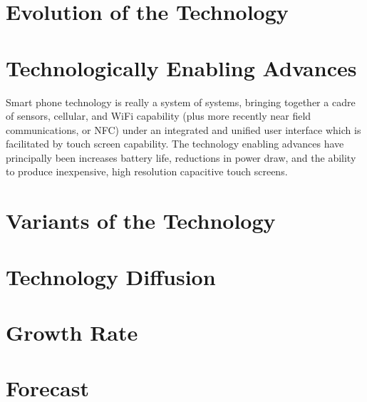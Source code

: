 \documentclass[letterpaper,10pt]{article}
\begin{document}
\section*{Evolution of the Technology}

\section*{Technologically Enabling Advances}
Smart phone technology is really a system of systems, bringing together a cadre of sensors, cellular, and WiFi capability (plus more recently near field communications, or NFC) under an integrated and unified user interface which is facilitated by touch screen capability.  The technology enabling advances have principally been increases battery life, reductions in power draw, and the ability to produce inexpensive, high resolution capacitive touch screens.

\section*{Variants of the Technology}

\section*{Technology Diffusion}

\section*{Growth Rate}

\section*{Forecast}
\end{document}
